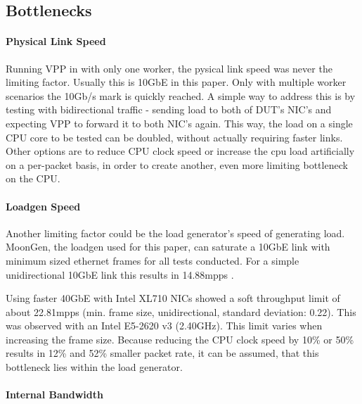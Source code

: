 \subsection{Bottlenecks}

\paragraph{Physical Link Speed}
\label{sec:linkspeed}


Running VPP in with only one worker, the pysical link speed was never
the limiting factor. Usually this is 10GbE in this paper. Only with
multiple worker scenarios the 10Gb/s mark is quickly reached. A simple
way to address this is by testing with bidirectional traffic - sending
load to both of DUT's NIC's and expecting VPP to forward it to both
NIC's again. This way, the load on a single CPU core to be tested can
be doubled, without actually requiring faster links. Other options are
to reduce CPU clock speed or increase the cpu load artificially on a
per-packet basis, in order to create another, even more limiting
bottleneck on the CPU.


\paragraph{Loadgen Speed}


Another limiting factor could be the load generator's speed of
generating load. MoonGen, the loadgen used for this paper, can
saturate a 10GbE link with minimum sized ethernet frames for all tests
conducted. For a simple unidirectional 10GbE link this results in
14.88mpps \cite{emmerich2015assessing}.


Using faster 40GbE with Intel XL710 NICs showed a soft throughput
limit of about 22.81mpps (min. frame size, unidirectional, standard
deviation: 0.22). This was observed with an Intel E5-2620 v3
(2.40GHz). This limit varies when increasing the frame size. Because
reducing the CPU clock speed by 10\% or 50\% results in 12\% and
52\% smaller packet rate, it can be assumed, that this bottleneck lies
within the load generator.

\paragraph{Internal Bandwidth}

